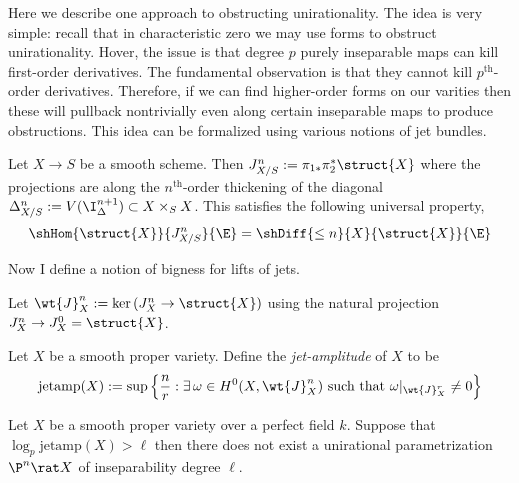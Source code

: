 \documentclass[12pt]{article}
\begin{document}
Here we describe one approach to obstructing unirationality. The idea is very simple: recall that in characteristic zero we may use forms to obstruct unirationality. Hover, the issue is that degree $p$ purely inseparable maps can kill first-order derivatives. The fundamental observation is that they cannot kill $p^{\text{th}}$-order derivatives. Therefore, if we can find higher-order forms on our varities then these will pullback nontrivially even along certain inseparable maps to produce obstructions. This idea can be formalized using various notions of jet bundles.

\begin{defn}
Let $X \to S$ be a smooth scheme. Then $J^n_{X/S} := \pi_{1*} \pi_2^* \struct{X}$ where the projections are along the $n^{\text{th}}$-order thickening of the diagonal $\Delta^n_{X/S} := V(\I_{\Delta}^{n+1}) \subset X \times_S X$. This satisfies the following universal property,
\[ \shHom{\struct{X}}{J^n_{X/S}}{\E} = \shDiff{\le n}{X}{\struct{X}}{\E} \]
\end{defn}

Now I define a notion of bigness for lifts of jets.

\newcommand{\jetamp}{\mathrm{jetamp}}

\begin{defn}
Let $\wt{J}^n_X := \ker{(J^n_X \to \struct{X})}$ using the natural projection $J^n_X \to J^0_X = \struct{X}$.
\end{defn}

\begin{defn}
Let $X$ be a smooth proper variety. Define the \textit{jet-amplitude} of $X$ to be
\[ \jetamp(X) := \sup \left \{ \frac{n}{r} : \exists \, \omega \in H^0(X, \wt{J}^{n}_X) \text{ such that } \omega|_{\wt{J}^{r}_X} \neq 0 \right\} \]
\end{defn}

\begin{theorem}[C]
Let $X$ be a smooth proper variety over a perfect field $k$. Suppose that $\log_p \jetamp(X) > \ell$ then there does not exist a unirational parametrization $\P^n \rat X$ of inseparability degree $\ell$.
\end{theorem}
\end{document}
